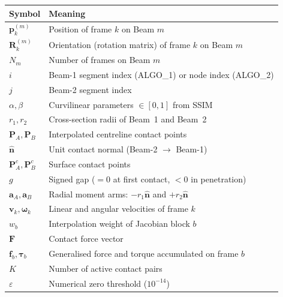\documentclass[11pt, a4paper]{article}
\newcommand{\vv}[1]{\bm{#1}}
\newcommand{\nn}{\hat{\vv{n}}}
\begin{document}
\begin{tabular}{ll}
\toprule
Symbol & Meaning \\
\midrule
$\vv{p}^{(m)}_k$ & Position of frame $k$ on Beam $m$ \\
$\vv{R}^{(m)}_k$ & Orientation (rotation matrix) of frame $k$ on Beam $m$ \\
$N_m$            & Number of frames on Beam $m$ \\
$i$              & Beam-1 segment index (ALGO\_1) or node index (ALGO\_2) \\
$j$              & Beam-2 segment index \\
$\alpha,\beta$   & Curvilinear parameters $\in [0,1]$ from SSIM \\
$r_1,r_2$        & Cross-section radii of Beam~1 and Beam~2 \\
$\vv{P}_A, \vv{P}_B$ & Interpolated centreline contact points \\
$\nn$            & Unit contact normal (Beam-2 $\to$ Beam-1) \\
$\vv{P}^c_A, \vv{P}^c_B$ & Surface contact points \\
$g$              & Signed gap ($= 0$ at first contact, $< 0$ in penetration) \\
$\vv{a}_A, \vv{a}_B$ & Radial moment arms: $-r_1\nn$ and $+r_2\nn$ \\
$\vv{v}_k, \bm{\omega}_k$ & Linear and angular velocities of frame $k$ \\
$w_b$            & Interpolation weight of Jacobian block $b$ \\
$\vv{F}$         & Contact force vector \\
$\vv{f}_b, \bm{\tau}_b$ & Generalised force and torque accumulated on frame $b$ \\
$K$              & Number of active contact pairs \\
$\varepsilon$    & Numerical zero threshold ($10^{-14}$) \\
\bottomrule
\end{tabular}
\end{document}
